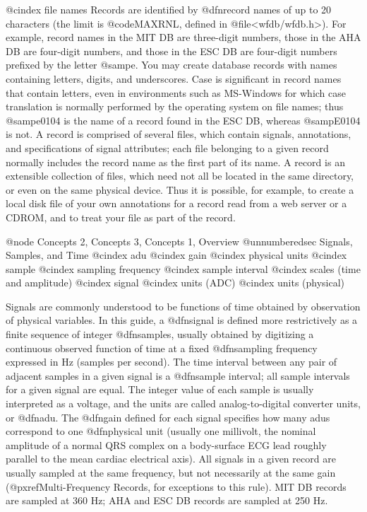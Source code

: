 @cindex file names
Records are identified by @dfn{record names} of up to 20 characters
(the limit is @code{MAXRNL}, defined in @file{<wfdb/wfdb.h>}).  For
example, record names in the MIT DB are three-digit numbers, those in
the AHA DB are four-digit numbers, and those in the ESC DB are
four-digit numbers prefixed by the letter @samp{e}.  You may create
database records with names containing letters, digits, and
underscores.  Case is significant in record names that contain
letters, even in environments such as MS-Windows for which case
translation is normally performed by the operating system on file
names; thus @samp{e0104} is the name of a record found in the ESC DB,
whereas @samp{E0104} is not.  A record is comprised of several files,
which contain signals, annotations, and specifications of signal
attributes; each file belonging to a given record normally includes
the record name as the first part of its name.  A record is an
extensible collection of files, which need not all be located in the
same directory, or even on the same physical device.  Thus it is
possible, for example, to create a local disk file of your own
annotations for a record read from a web server or a CDROM, and to
treat your file as part of the record.

@node     Concepts 2, Concepts 3, Concepts 1, Overview
@unnumberedsec Signals, Samples, and Time
@cindex adu
@cindex gain
@cindex physical units
@cindex sample
@cindex sampling frequency
@cindex sample interval
@cindex scales (time and amplitude)
@cindex signal
@cindex units (ADC)
@cindex units (physical)

Signals are commonly understood to be functions of time obtained by
observation of physical variables.  In this guide, a @dfn{signal} is
defined more restrictively as a finite sequence of integer
@dfn{samples}, usually obtained by digitizing a continuous observed
function of time at a fixed @dfn{sampling frequency} expressed in Hz
(samples per second).  The time interval between any pair of adjacent
samples in a given signal is a @dfn{sample interval}; all sample
intervals for a given signal are equal.  The integer value of each
sample is usually interpreted as a voltage, and the units are called
analog-to-digital converter units, or @dfn{adu}.  The @dfn{gain} defined
for each signal specifies how many adus correspond to one @dfn{physical
unit} (usually one millivolt, the nominal amplitude of a normal QRS
complex on a body-surface ECG lead roughly parallel to the mean cardiac
electrical axis).  All signals in a given record are usually sampled at
the same frequency, but not necessarily at the same gain
(@pxref{Multi-Frequency Records}, for exceptions to
this rule).  MIT DB records are sampled at 360 Hz; AHA and ESC DB
records are sampled at 250 Hz.

